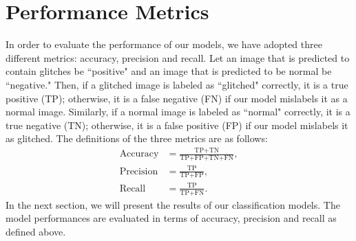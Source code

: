 \section{Performance Metrics}
In order to evaluate the performance of our models, we have adopted three different metrics: accuracy, precision and recall. Let an image that is predicted to contain glitches be ``positive" and an image that is predicted to be normal be ``negative." Then, if a glitched image is labeled as ``glitched" correctly, it is a true positive (TP); otherwise, it is a false negative (FN) if our model mislabels it as a normal image. Similarly, if a normal image is labeled as ``normal" correctly, it is a true negative (TN); otherwise, it is a false positive (FP) if our model mislabels it as glitched. The definitions of the three metrics are as follows:
\begin{align}
\text{Accuracy}&=\frac{\text{TP+TN}}{\text{TP+FP+TN+FN}},\\\nonumber
\text{Precision}&=\frac{\text{TP}}{\text{TP+FP}},\\\nonumber
\text{Recall}&=\frac{\text{TP}}{\text{TP+FN}}\nonumber.
\end{align}
\noindent In the next section, we will present the results of our classification models. The model performances are evaluated in terms of accuracy, precision and recall as defined above.

\endinput